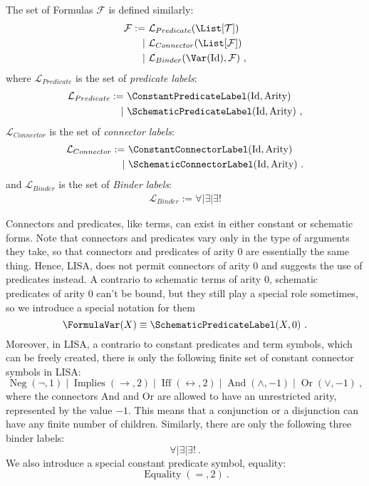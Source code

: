 \begin{definition}[Formulas]
  The set of Formulas $\mathcal{F}$ is defined similarly:
  \begin{align}
    \mathcal{F} := & ~\mathcal{L}_{Predicate}(\List[\mathcal{T}])                \\
    \mid           & ~\mathcal{L}_{Connector}(\List[\mathcal{F}])                \\
    \mid           & ~\mathcal{L}_{Binder}(\Var(\textnormal{Id}), \mathcal{F})~,
  \end{align}
  where $\mathcal{L}_{Predicate}$ is the set of \textit{predicate labels}:
  \begin{align}
    \mathcal{L}_{Predicate} := & ~\ConstantPredicateLabel(\textnormal{Id}, \textnormal{Arity})    \\
    \mid                       & ~\SchematicPredicateLabel(\textnormal{Id}, \textnormal{Arity})~,
  \end{align}
  $\mathcal{L}_{Connector}$ is the set of \textit{connector labels}:
  \begin{align}
    \mathcal{L}_{Connector} := & ~\ConstantConnectorLabel(\textnormal{Id}, \textnormal{Arity})    \\
    \mid                       & ~\SchematicConnectorLabel(\textnormal{Id}, \textnormal{Arity})~.
  \end{align}
  and $\mathcal{L}_{Binder}$ is the set of \textit{Binder labels}:
  \begin{align}
    \mathcal{L}_{Binder} := \forall \mid \exists \mid \exists!
  \end{align}

  Connectors and predicates, like terms, can exist in either constant or schematic forms. Note that connectors and predicates vary only in the type of arguments they take, so that connectors and predicates of arity 0 are essentially the same thing. Hence, LISA, does not permit connectors of arity 0 and suggests the use of predicates instead.
  A contrario to schematic terms of arity 0, schematic predicates of arity 0 can't be bound, but they still play a special role sometimes, so we introduce a special notation for them
  $$
    \FormulaVar(X) \equiv \SchematicPredicateLabel(X, 0)~.
  $$
  Moreover, in LISA, a contrario to constant predicates and term symbols, which can be freely created, there is only the following finite set of constant connector symbols in LISA:
  $$
    \operatorname{Neg}(\neg, 1)\mid \operatorname{Implies}(\rightarrow, 2)\mid \operatorname{Iff}(\leftrightarrow, 2)\mid \operatorname{And}(\land, -1)\mid \operatorname{Or}(\lor, -1)~,
  $$
  where the connectors And and Or are allowed to have an unrestricted arity, represented by the value $-1$. This means that a conjunction or a disjunction can have any finite number of children.
  Similarly, there are only the following three binder labels:
  $$
    \forall \mid \exists \mid \exists !~.
  $$
  We also introduce a special constant predicate symbol, equality:
  $$
    \operatorname{Equality}(=, 2)~.
  $$
\end{definition}
